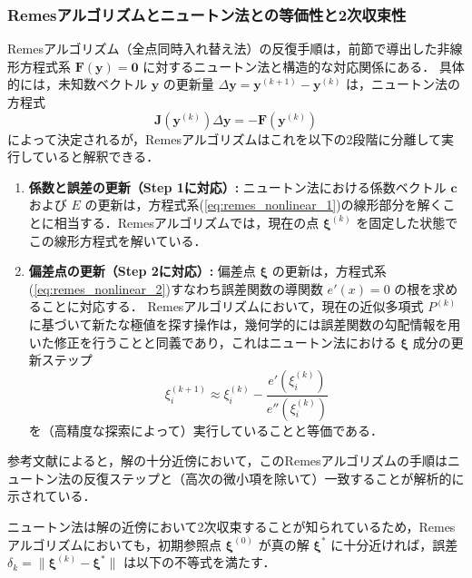 \subsubsection{Remesアルゴリズムとニュートン法との等価性と2次収束性}
\label{subsec:newton_equivalence}

Remesアルゴリズム（全点同時入れ替え法）の反復手順は，前節で導出した非線形方程式系 $\boldsymbol{F}(\boldsymbol{y}) = \boldsymbol{0}$ に対するニュートン法と構造的な対応関係にある．
具体的には，未知数ベクトル $\boldsymbol{y}$ の更新量 $\Delta \boldsymbol{y} = \boldsymbol{y}^{(k+1)} - \boldsymbol{y}^{(k)}$ は，ニュートン法の方程式
\begin{equation}
  \boldsymbol{J}(\boldsymbol{y}^{(k)}) \Delta \boldsymbol{y} = -\boldsymbol{F}(\boldsymbol{y}^{(k)})
  \label{eq:newton_step}
\end{equation}
によって決定されるが，Remesアルゴリズムはこれを以下の2段階に分離して実行していると解釈できる\cite{seminar-note}．

\begin{enumerate}
  \item \textbf{係数と誤差の更新（Step 1に対応）:}
  ニュートン法における係数ベクトル $\boldsymbol{c}$ および $E$ の更新は，方程式系(\ref{eq:remes_nonlinear_1})の線形部分を解くことに相当する．Remesアルゴリズムでは，現在の点 $\boldsymbol{\xi}^{(k)}$ を固定した状態でこの線形方程式を解いている．
  
  \item \textbf{偏差点の更新（Step 2に対応）:}
  偏差点 $\boldsymbol{\xi}$ の更新は，方程式系(\ref{eq:remes_nonlinear_2})すなわち誤差関数の導関数 $e'(x)=0$ の根を求めることに対応する．
  Remesアルゴリズムにおいて，現在の近似多項式 $P^{(k)}$ に基づいて新たな極値を探す操作は，幾何学的には誤差関数の勾配情報を用いた修正を行うことと同義であり，これはニュートン法における $\boldsymbol{\xi}$ 成分の更新ステップ
  \[ \xi_i^{(k+1)} \approx \xi_i^{(k)} - \frac{e'(\xi_i^{(k)})}{e''(\xi_i^{(k)})} \]
  を（高精度な探索によって）実行していることと等価である．
\end{enumerate}

参考文献\cite{seminar-note}によると，解の十分近傍において，このRemesアルゴリズムの手順はニュートン法の反復ステップと（高次の微小項を除いて）一致することが解析的に示されている．

ニュートン法は解の近傍において2次収束することが知られているため，Remesアルゴリズムにおいても，初期参照点 $\boldsymbol{\xi}^{(0)}$ が真の解 $\boldsymbol{\xi}^*$ に十分近ければ，誤差 $\delta_k = \|\boldsymbol{\xi}^{(k)} - \boldsymbol{\xi}^*\|$ は以下の不等式を満たす．

